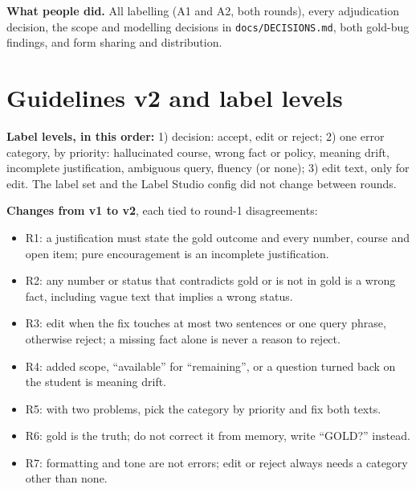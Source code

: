 \documentclass[11pt,a4paper]{article}
\newcommand{\f}[1]{\nolinkurl{#1}}
\newcounter{ev}
\begin{document}
\textbf{What people did.} All labelling (A1 and A2, both rounds), every adjudication decision, the scope and
modelling decisions in \f{docs/DECISIONS.md}, both gold-bug findings, and form sharing and distribution.

\section{Guidelines v2 and label levels}\label{app:c}
\textbf{Label levels, in this order:} 1) decision: accept, edit or reject; 2) one error category, by priority:
hallucinated course, wrong fact or policy, meaning drift, incomplete justification, ambiguous query, fluency (or
none); 3) edit text, only for edit. The label set and the Label Studio config did not change between rounds.

\textbf{Changes from v1 to v2}, each tied to round-1 disagreements:
\begin{itemize}
\item R1: a justification must state the gold outcome and every number, course and open item; pure encouragement is
  an incomplete justification.
\item R2: any number or status that contradicts gold or is not in gold is a wrong fact, including vague text that
  implies a wrong status.
\item R3: edit when the fix touches at most two sentences or one query phrase, otherwise reject; a missing fact alone
  is never a reason to reject.
\item R4: added scope, ``available'' for ``remaining'', or a question turned back on the student is meaning drift.
\item R5: with two problems, pick the category by priority and fix both texts.
\item R6: gold is the truth; do not correct it from memory, write ``GOLD?'' instead.
\item R7: formatting and tone are not errors; edit or reject always needs a category other than none.
\end{itemize}

\clearpage
\end{document}
